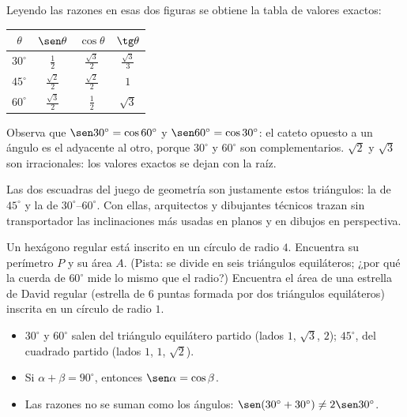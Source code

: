 \documentclass[11pt]{article}
\begin{document}
Leyendo las razones en esas dos figuras se obtiene la tabla de valores exactos:

\begin{center}
{\renewcommand{\arraystretch}{1.6}
\begin{tabular}{cccc}
  \toprule
  $\theta$ & $\sen\theta$ & $\cos\theta$ & $\tg\theta$\\
  \midrule
  $30^\circ$ & $\frac{1}{2}$ & $\frac{\sqrt{3}}{2}$ & $\frac{\sqrt{3}}{3}$\\
  $45^\circ$ & $\frac{\sqrt{2}}{2}$ & $\frac{\sqrt{2}}{2}$ & $1$\\
  $60^\circ$ & $\frac{\sqrt{3}}{2}$ & $\frac{1}{2}$ & $\sqrt{3}$\\
  \bottomrule
\end{tabular}}
\end{center}

Observa que $\sen 30^\circ = \cos 60^\circ$ y $\sen 60^\circ = \cos 30^\circ$: el
cateto opuesto a un ángulo es el adyacente al otro, porque $30^\circ$ y
$60^\circ$ son complementarios. $\sqrt{2}$ y $\sqrt{3}$ son irracionales: los
valores exactos se dejan con la raíz.

\begin{aplicacion}
Las dos escuadras del juego de geometría son justamente estos triángulos: la
de $45^\circ$ y la de $30^\circ$--$60^\circ$. Con ellas, arquitectos y
dibujantes técnicos trazan sin transportador las inclinaciones más usadas en
planos y en dibujos en perspectiva.
\end{aplicacion}

\begin{preguntas}
\pregunta Un hexágono regular está inscrito en un círculo de radio $4$. Encuentra su
perímetro $P$ y su área $A$. (Pista: se divide en seis triángulos equiláteros;
¿por qué la cuerda de $60^\circ$ mide lo mismo que el radio?)
\espacio{3cm}
\pregunta Encuentra el área de una estrella de David regular (estrella de $6$ puntas
formada por dos triángulos equiláteros) inscrita en un círculo de radio $1$.
\espacio{3.5cm}
\end{preguntas}

\begin{resumen}
\begin{itemize}
  \item $30^\circ$ y $60^\circ$ salen del triángulo equilátero partido (lados $1$, $\sqrt{3}$, $2$);
        $45^\circ$, del cuadrado partido (lados $1$, $1$, $\sqrt{2}$).
  \item Si $\alpha + \beta = 90^\circ$, entonces $\sen\alpha = \cos\beta$.
  \item Las razones no se suman como los ángulos: $\sen(30^\circ + 30^\circ) \neq 2\sen 30^\circ$.
\end{itemize}
\end{resumen}
\end{document}
